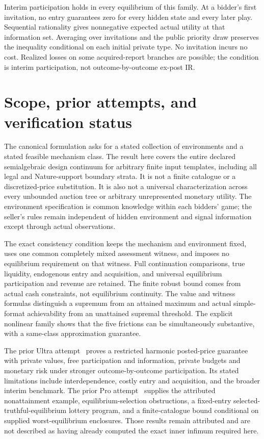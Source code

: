 \documentclass[11pt,a4paper]{article}
\numberwithin{equation}{section}
\theoremstyle{definition}
\begin{document}
Interim participation holds in every equilibrium of this family.
At a bidder's first invitation, no entry guarantees zero for every
hidden state and every later play.
Sequential rationality gives nonnegative expected actual utility at
that information set.
Averaging over invitations and the public priority draw preserves
the inequality conditional on each initial private type.
No invitation incurs no cost.
Realized losses on some acquired-report branches are possible;
the condition is interim participation, not outcome-by-outcome ex-post IR.

\section{Scope, prior attempts, and verification status}\label{sec:scope}
The canonical formulation asks for a stated collection of environments
and a stated feasible mechanism class.
The result here covers the entire declared semialgebraic design
continuum for arbitrary finite input templates, including all legal
and Nature-support boundary strata.
It is not a finite catalogue or a discretized-price substitution.
It is also not a universal characterization across every unbounded
auction tree or arbitrary unrepresented monetary utility.
The environment specification is common knowledge within each
bidders' game; the seller's rules remain independent of hidden
environment and signal information except through actual observations.

The exact consistency condition keeps the mechanism and environment
fixed, uses one common completely mixed assessment witness, and imposes
no equilibrium requirement on that witness.
Full continuation comparisons, true liquidity, endogenous entry and
acquisition, and universal equilibrium participation and revenue are
retained. The finite robust bound comes from actual cash constraints,
not equilibrium continuity.
The value and witness formulas distinguish a supremum from an attained
maximum and actual simple-format achievability from an unattained
supremal threshold.
The explicit nonlinear family shows that the five frictions can be
simultaneously substantive, with a same-class approximation guarantee.

The prior Ultra attempt~\cite{PriorUltra} proves a restricted
harmonic posted-price guarantee with private values, free participation
and information, private budgets and monetary risk under stronger
outcome-by-outcome participation.
Its stated limitations include interdependence, costly entry and
acquisition, and the broader interim benchmark.
The prior Pro attempt~\cite{PriorPro} supplies the attributed
nonattainment example, equilibrium-selection obstructions, a
fixed-entry selected-truthful-equilibrium lottery program, and a
finite-catalogue bound conditional on supplied worst-equilibrium
enclosures.
Those results remain attributed and are not described as having
already computed the exact inner infimum required here.
\end{document}
